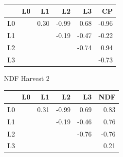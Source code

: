 \documentclass[12pt, letterpaper]{article}
\begin{document}
\begin{table}[h]
\begin{minipage}[h]{.45\textwidth}
\medskip

\begin{tabular}{rrrrrr}
 & L0 & L1 & L2 & L3 & CP \\ 
  \hline
L0 &  & 0.30 & -0.99 & 0.68 & -0.96 \\ 
  L1 & & & -0.19 & -0.47 & -0.22 \\ 
  L2 & & & & -0.74 & 0.94 \\ 
  L3 & & & & & -0.73 \\ 
   \hline
\end{tabular}
\bigskip
\bigskip

NDF Harvest 2

\medskip
\begin{tabular}{rrrrrr}
  \hline
 & L0 & L1 & L2 & L3 & NDF \\ 
  \hline
  L0 & & 0.31 & -0.99 & 0.69 & 0.83 \\ 
  L1 & & & -0.19 & -0.46 & 0.76 \\ 
  L2 & & & & -0.76 & -0.76 \\ 
  L3 & & & & & 0.21 \\ 
   \hline
\end{tabular}

\end{minipage}%
\end{table}
\end{document}

